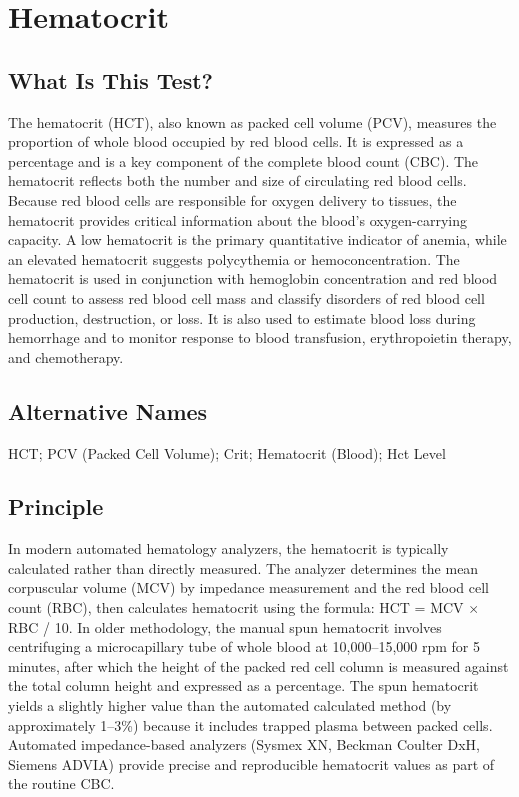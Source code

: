 \chapter{Hematocrit}

\section*{What Is This Test?}
The hematocrit (HCT), also known as packed cell volume (PCV), measures the proportion of whole blood occupied by red blood cells. It is expressed as a percentage and is a key component of the complete blood count (CBC). The hematocrit reflects both the number and size of circulating red blood cells. Because red blood cells are responsible for oxygen delivery to tissues, the hematocrit provides critical information about the blood's oxygen-carrying capacity. A low hematocrit is the primary quantitative indicator of anemia, while an elevated hematocrit suggests polycythemia or hemoconcentration. The hematocrit is used in conjunction with hemoglobin concentration and red blood cell count to assess red blood cell mass and classify disorders of red blood cell production, destruction, or loss. It is also used to estimate blood loss during hemorrhage and to monitor response to blood transfusion, erythropoietin therapy, and chemotherapy.

\section*{Alternative Names}
HCT; PCV (Packed Cell Volume); Crit; Hematocrit (Blood); Hct Level

\section*{Principle}
In modern automated hematology analyzers, the hematocrit is typically calculated rather than directly measured. The analyzer determines the mean corpuscular volume (MCV) by impedance measurement and the red blood cell count (RBC), then calculates hematocrit using the formula: HCT = MCV $\times$ RBC / 10. In older methodology, the manual spun hematocrit involves centrifuging a microcapillary tube of whole blood at 10,000--15,000 rpm for 5 minutes, after which the height of the packed red cell column is measured against the total column height and expressed as a percentage. The spun hematocrit yields a slightly higher value than the automated calculated method (by approximately 1--3\%) because it includes trapped plasma between packed cells. Automated impedance-based analyzers (Sysmex XN, Beckman Coulter DxH, Siemens ADVIA) provide precise and reproducible hematocrit values as part of the routine CBC.


